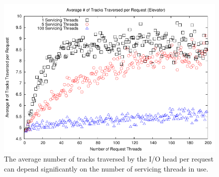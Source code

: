 \documentclass{report}
\begin{document}
\newpage
\begin{figure}[htb!]
    \centering
    \includegraphics[scale=1]{distanceElevator.pdf}
    \caption{The average number of tracks traversed by the I/O head per request can depend
    significantly on the number of servicing threads in use.}
    \label{fig:distanceElevator}
\end{figure}
\end{document}
